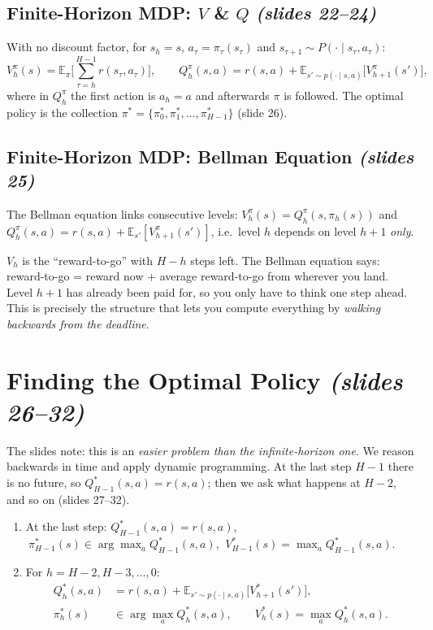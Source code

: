 \documentclass[11pt,a4paper]{article}
\newcommand{\E}{\mathbb{E}}
\newcommand{\slides}[1]{\emph{(slides #1)}}
\theoremstyle{plain}
\theoremstyle{definition}
\theoremstyle{remark}
\begin{document}
\subsection{Finite-Horizon MDP: $V$ \& $Q$ \slides{22--24}}

With no discount factor, for $s_h=s$, $a_\tau=\pi_\tau(s_\tau)$ and $s_{\tau+1}\sim P(\cdot\mid s_\tau,a_\tau)$:
\[
V^\pi_h(s)=\E_\pi\Big[\sum_{\tau=h}^{H-1} r(s_\tau,a_\tau)\Big],\qquad
Q^\pi_h(s,a)=r(s,a)+\E_{s'\sim p(\cdot\mid s,a)}\big[V^\pi_{h+1}(s')\big],
\]
where in $Q^\pi_h$ the first action is $a_h=a$ and afterwards $\pi$ is followed. The optimal policy is the collection $\pi^*=\{\pi^*_0,\pi^*_1,\dots,\pi^*_{H-1}\}$ (slide 26).

\subsection{Finite-Horizon MDP: Bellman Equation \slides{25}}

The Bellman equation links consecutive levels: $V^\pi_h(s)=Q^\pi_h(s,\pi_h(s))$ and $Q^\pi_h(s,a)=r(s,a)+\E_{s'}[V^\pi_{h+1}(s')]$, i.e.\ level $h$ depends on level $h+1$ \emph{only}.

\begin{intuition}
$V_h$ is the ``reward-to-go'' with $H-h$ steps left. The Bellman equation says: reward-to-go = reward now + average reward-to-go from wherever you land. Level $h+1$ has already been paid for, so you only have to think one step ahead. This is precisely the structure that lets you compute everything by \emph{walking backwards from the deadline}.
\end{intuition}

\section{Finding the Optimal Policy \slides{26--32}}

The slides note: this is an \emph{easier problem than the infinite-horizon one}. We reason backwards in time and apply dynamic programming. At the last step $H-1$ there is no future, so $Q^*_{H-1}(s,a)=r(s,a)$; then we ask what happens at $H-2$, and so on (slides 27--32).

\begin{algorithm}\label{alg:bi}
\begin{enumerate}[nosep]
  \item At the last step: $Q^*_{H-1}(s,a)=r(s,a)$, $\ \pi^*_{H-1}(s)\in\arg\max_a Q^*_{H-1}(s,a)$, $\ V^*_{H-1}(s)=\max_a Q^*_{H-1}(s,a)$.
  \item For $h=H-2,H-3,\dots,0$:
  \begin{align*}
  Q^*_h(s,a)&=r(s,a)+\E_{s'\sim p(\cdot\mid s,a)}\big[V^*_{h+1}(s')\big],\\
  \pi^*_h(s)&\in\arg\max_a Q^*_h(s,a),\qquad V^*_h(s)=\max_a Q^*_h(s,a).
  \end{align*}
\end{enumerate}
\end{algorithm}
\end{document}
